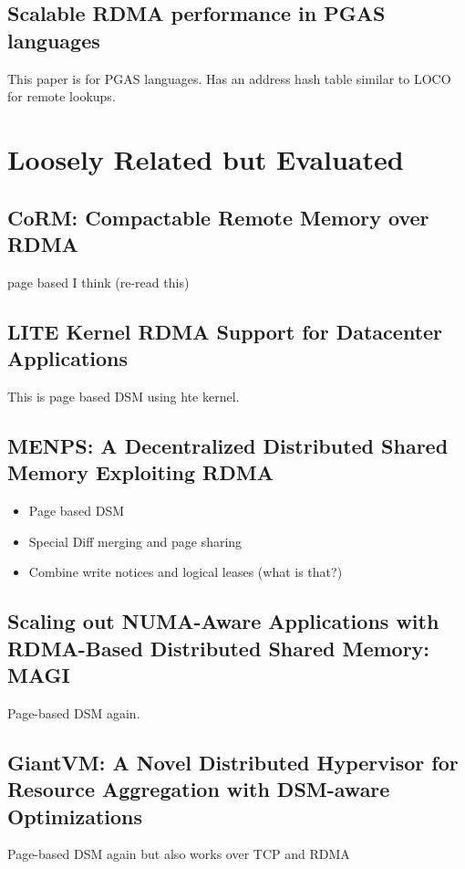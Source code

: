 \documentclass[sigplan,nonacm]{acmart}
\begin{document}
\subsection{Scalable RDMA performance in PGAS languages}
This paper is for PGAS languages. Has an address hash table similar to LOCO for remote lookups.\cite{Farreras-IPDPS-2009}

\section{Loosely Related but Evaluated}
\subsection{CoRM: Compactable Remote Memory over RDMA}
page based I think (re-read this)\cite{Taranov-ICMD-2021}

\subsection{LITE Kernel RDMA Support for Datacenter Applications}
This is page based DSM using hte kernel. \cite{Tsai-SOSP-2017}

\subsection{MENPS: A Decentralized Distributed Shared Memory Exploiting RDMA}
\begin{itemize}
    \item Page based DSM
    \item Special Diff merging and page sharing
    \item Combine write notices and logical leases (what is that?)\cite{Endo-IPDRM-2020}
\end{itemize}

\subsection{Scaling out NUMA-Aware Applications with RDMA-Based Distributed Shared Memory: MAGI}
Page-based DSM again. \cite{Hong-JCST-2019}


\subsection {GiantVM: A Novel Distributed Hypervisor for Resource Aggregation with DSM-aware Optimizations}
Page-based DSM again but also works over TCP and RDMA\cite{Jia-ACO-2022}
\end{document}
